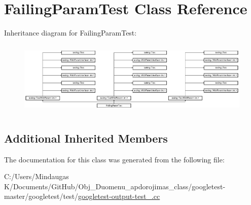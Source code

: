 \hypertarget{class_failing_param_test}{}\section{Failing\+Param\+Test Class Reference}
\label{class_failing_param_test}
Inheritance diagram for Failing\+Param\+Test\+:\begin{figure}[H]
\begin{center}
\leavevmode
\includegraphics[height=3.572568cm]{d7/d88/class_failing_param_test}
\end{center}
\end{figure}
\subsection*{Additional Inherited Members}


The documentation for this class was generated from the following file\+:\begin{DoxyCompactItemize}
\item 
C\+:/\+Users/\+Mindaugas K/\+Documents/\+Git\+Hub/\+Obj\+\_\+\+Duomenu\+\_\+apdorojimas\+\_\+class/googletest-\/master/googletest/test/\mbox{\hyperlink{googletest-master_2googletest_2test_2googletest-output-test___8cc}{googletest-\/output-\/test\+\_\+.\+cc}}\end{DoxyCompactItemize}
